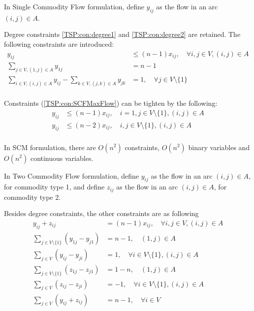 					In Single Commodity Flow formulation, define $y_{ij}$ as the flow in an arc $(i, j) \in A$.

					Degree constraints \ref{TSP:con:degree1} and \ref{TSP:con:degree2} are retained. The following constraints are introduced:
					\begin{align}
						y_{ij} & \le (n - 1) x_{ij}, \quad \forall i, j \in V, (i, j) \in A \label{TSP:con:SCFMaxFlow}\\
						\sum_{j \in V, (1, j) \in A} y_{1j} & = n - 1 \label{TSP:con:SCFInitFlow} \\
						\sum_{i \in V, (i, j) \in A} y_{ij} - \sum_{k \in V, (j, k) \in A} y_{jk} &= 1, \quad \forall j \in V \setminus \{1\} \label{TSP:con:SCFFlowBalance}\\
					\end{align}

					Constraints (\ref{TSP:con:SCFMaxFlow}) can be tighten by the following:
					\begin{align}
						y_{ij} &\le (n - 1) x_{ij}, \quad i = 1, j \in V \setminus \{1\}, (i, j) \in A \label{TSP:con:SCMMaxFlow1} \\
						y_{ij} &\le (n - 2) x_{ij}, \quad i, j \in V \setminus \{1\}, (i, j) \in A \label{TSP:con:SCMMaxFlow2} \\
					\end{align}

					In SCM formulation, there are $O(n^2)$ constraints, $O(n^2)$ binary variables and $O(n^2)$ continuous variables.

					In Two Commodity Flow formulation, define $y_{ij}$ as the flow in an arc $(i, j) \in A$, for commodity type 1, and define $z_{ij}$ as the flow in an arc $(i, j) \in A$, for commodity type 2.

					Besides degree constraints, the other constraints are as following
					\begin{align}
						y_{ij} + z_{ij} &= (n - 1) x_{ij}, \quad \forall i, j \in V, (i, j) \in A \label{TSP:con:TCMFlowExist} \\
						\sum_{j \in V \setminus \{1\}} (y_{1j} - y_{j1}) &= n - 1, \quad (1, j) \in A \label{TSP:con:TCMInitFlowY}\\
						\sum_{j \in V} (y_{ij} - y_{ji}) & = 1, \quad  \forall i \in V \setminus \{1\}, (i, j) \in A \label{TSP:con:TCMFlowBalanceY}\\
						\sum_{j \in V \setminus \{1\}} (z_{1j} - z_{j1}) &= 1 - n, \quad (1, j) \in A \label{TSP:con:TCMInitFlowZ}\\
						\sum_{j \in V} (z_{ij} - z_{ji}) & = -1, \quad  \forall i \in V \setminus \{1\}, (i, j) \in A \label{TSP:con:TCMFlowBalanceZ}\\
						\sum_{j \in V} (y_{ij} + z_{ij}) &= n - 1, \quad \forall i \in V \label{TSP:con:TCMFlowOnArc}\\
					\end{align}

